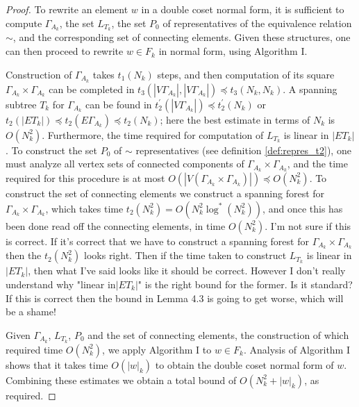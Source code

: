 \documentclass[a4paper,12pt]{article}
\newcommand{\G}{\Gamma }
\numberwithin{equation}{section}
\numberwithin{figure}{section}
\begin{document}
\begin{proof}
To rewrite an element $w$ in a double coset normal form, it is
sufficient to compute $\G_{A_k}$, the set $L_{T_k}$,
the set $P_0$  of
 representatives of the equivalence relation $\sim$, and the
corresponding  set of connecting elements.
 Given these structures, one can then proceed to rewrite $w \in
F_k$ in normal form, using Algorithm I.

Construction of $\G_{A_k}$ takes  $t_1(N_k)$ steps, and then
computation of its square
 $\G_{A_k} \times \G_{A_k}$ can be completed in
 $t_3(|V\G_{A_k}|,|V\G_{A_k}|) \preceq t_3(N_k,N_k)$.
A spanning subtree $T_k$ for $\G_{A_k}$ can be found in
$t^{\prime}_2(|V\G_{A_k}|) \preceq t^{\prime}_2(N_k)$ or $t_2(|E
T_k|) \preceq t_2(E\G_{A_k}) \preceq t_2(N_k)$; here the best
estimate in terms of $N_k$ is $O(N_k^2)$. Furthermore, the time
required for computation of $L_{T_k}$ is linear in $|E T_k|$.
To construct the set $P_0$ of $\sim$
representatives (see definition \ref{def:repres_t2}), one must
analyze all vertex sets of connected components of $\G_{A_k}
\times \G_{A_k}$, and the time  required for this procedure is at
most $O(|V(\G_{A_k} \times \G_{A_k})|) \preceq O(N^2_k)$. To construct
the set of connecting elements we construct a spanning forest for
$\G_{A_k} \times \G_{A_k}$, which takes time $t_2(N_k^2)
=O(N_k^2\log^*(N_k^2))$, and once this
has been done read off the connecting elements, in time $O(N^2_k)$.
{\ajd I'm not sure if this is correct. If it's correct that
we have to construct a spanning forest for $\G_{A_k} \times \G_{A_k}$
then the $t_2(N_k^2)$ looks right. Then
if the time taken to construct $L_{T_k}$ is
linear in $|ET_k|$, then what I've said looks like it should be correct.
However I don't really understand why "linear in$|ET_k|$" is the right bound
for the former. Is it standard? If this is correct then the bound
in Lemma 4.3 is going to get worse, which will be a shame!}

Given $\G_{A_k}$, $L_{T_k}$, $P_0$ and the set of connecting elements,
the construction of which required time
 $O(N^2_k)$,
 we apply Algorithm I to $w \in F_k$. Analysis
of Algorithm I shows that it takes time  $O(|w|_k)$  to obtain
the double coset normal form of $w$. Combining these estimates
 we obtain a total bound of $O(N^2_k + |w|_k)$, as required.
\end{proof}
\end{document}
